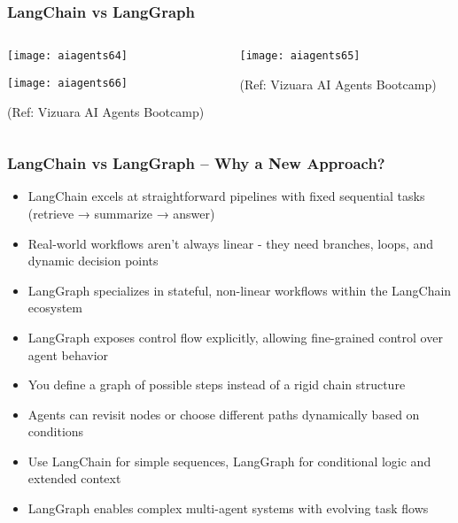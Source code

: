 \begin{frame}[fragile]\frametitle{LangChain vs LangGraph}
\begin{columns}
    \begin{column}[T]{0.6\linewidth}
        \begin{center}
        \texttt{[image: aiagents64]}
		
        \texttt{[image: aiagents66]}
		
		{\tiny (Ref: Vizuara AI Agents Bootcamp)}
				
        \end{center}    
    \end{column}
    \begin{column}[T]{0.4\linewidth}
        \begin{center}
        \texttt{[image: aiagents65]}
		
		{\tiny (Ref: Vizuara AI Agents Bootcamp)}
				
        \end{center}    
    \end{column}
  \end{columns}
\end{frame}


\begin{frame}[fragile]\frametitle{LangChain vs LangGraph – Why a New Approach?}

      \begin{itemize}
        \item LangChain excels at straightforward pipelines with fixed sequential tasks (retrieve → summarize → answer)
        \item Real-world workflows aren't always linear - they need branches, loops, and dynamic decision points
        \item LangGraph specializes in stateful, non-linear workflows within the LangChain ecosystem
        \item LangGraph exposes control flow explicitly, allowing fine-grained control over agent behavior
        \item You define a graph of possible steps instead of a rigid chain structure
        \item Agents can revisit nodes or choose different paths dynamically based on conditions
        \item Use LangChain for simple sequences, LangGraph for conditional logic and extended context
        \item LangGraph enables complex multi-agent systems with evolving task flows
      \end{itemize}

\end{frame}

